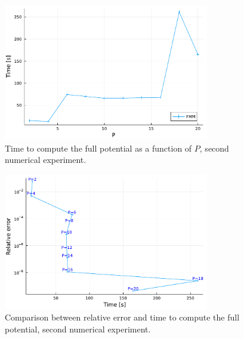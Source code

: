 \documentclass[final,onefignum,onetabnum]{siamart220329}
\begin{document}
\begin{figure}[h!]
\centering
\includegraphics[width=0.8\textwidth]{ptime}
\caption{Time to compute the full potential as a function of $P$, second numerical experiment.}
\label{fig:ptime}
\end{figure}
\clearpage
\begin{figure}[h!]
\centering
\includegraphics[width=0.8\textwidth]{ptimeerror}
\caption{Comparison between relative error and time to compute the full potential, second numerical experiment.}
\label{fig:ptimeerror}
\end{figure}



\end{document}

